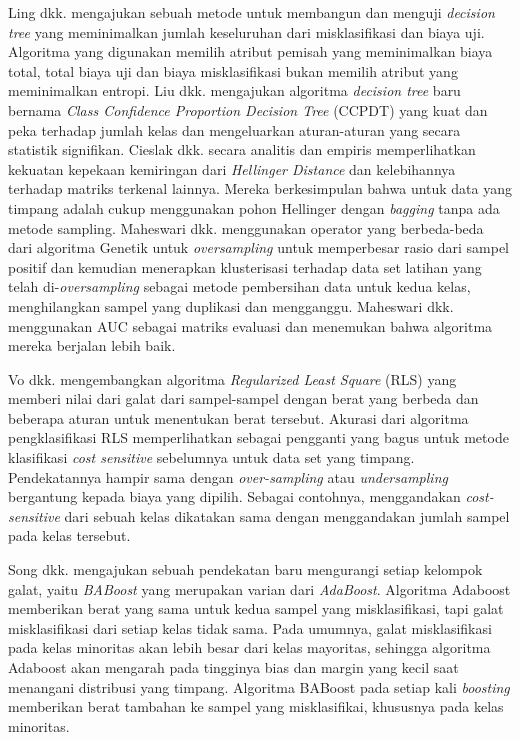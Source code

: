 \documentclass[12pt,a4paper,titlepage]{article}
\begin{document}
Ling dkk. \cite{ling2004decision} mengajukan sebuah metode untuk membangun dan menguji \textit{decision tree} yang meminimalkan jumlah keseluruhan dari misklasifikasi dan biaya uji.
Algoritma yang digunakan memilih atribut pemisah yang meminimalkan biaya total, total biaya uji dan biaya misklasifikasi bukan memilih atribut yang meminimalkan entropi.
Liu dkk. \cite{liu2010robust} mengajukan algoritma \textit{decision tree} baru bernama \textit{Class Confidence Proportion Decision Tree} (CCPDT) yang kuat dan peka terhadap jumlah kelas dan mengeluarkan aturan-aturan yang secara statistik signifikan.
Cieslak dkk. \cite{cieslak2012hellinger} secara analitis dan empiris memperlihatkan kekuatan kepekaan kemiringan dari \textit{Hellinger Distance} dan kelebihannya terhadap matriks terkenal lainnya.
Mereka berkesimpulan bahwa untuk data yang timpang adalah cukup menggunakan pohon Hellinger dengan \textit{bagging} tanpa ada metode sampling.
Maheswari dkk. \cite{maheshwari2011new} menggunakan operator yang berbeda-beda dari algoritma Genetik untuk \textit{oversampling} untuk memperbesar rasio dari sampel positif dan kemudian menerapkan klusterisasi terhadap data set latihan yang telah di-\textit{oversampling} sebagai metode pembersihan data untuk kedua kelas, menghilangkan sampel yang duplikasi dan mengganggu.
Maheswari dkk. menggunakan AUC sebagai matriks evaluasi dan menemukan bahwa algoritma mereka berjalan lebih baik.

Vo dkk. \cite{vo2007classification} mengembangkan algoritma \textit{Regularized Least Square} (RLS) yang memberi nilai dari galat dari sampel-sampel dengan berat yang berbeda dan beberapa aturan untuk menentukan berat tersebut.
Akurasi dari algoritma pengklasifikasi RLS memperlihatkan sebagai pengganti yang bagus untuk metode klasifikasi \textit{cost sensitive} sebelumnya untuk data set yang timpang.
Pendekatannya hampir sama dengan \textit{over-sampling} atau \hfill\break
\textit{under\-sampling} bergantung kepada biaya yang dipilih.
Sebagai contohnya, menggandakan \textit{cost-sensitive} dari sebuah kelas dikatakan sama dengan menggandakan jumlah sampel pada kelas tersebut.

Song dkk. \cite{song2009improved} mengajukan sebuah pendekatan baru mengurangi setiap kelompok galat, yaitu \textit{BABoost} yang merupakan varian dari \textit{AdaBoost}.
Algoritma Adaboost memberikan berat yang sama untuk kedua sampel yang misklasifikasi, tapi galat misklasifikasi dari setiap kelas tidak sama.
Pada umumnya, galat misklasifikasi pada kelas minoritas akan lebih besar dari kelas mayoritas, sehingga algoritma Adaboost akan mengarah pada tingginya bias dan margin yang kecil saat menangani distribusi yang timpang.
Algoritma BABoost pada setiap kali \textit{boosting} memberikan berat tambahan ke sampel yang misklasifikai, khususnya pada kelas minoritas.
\end{document}
